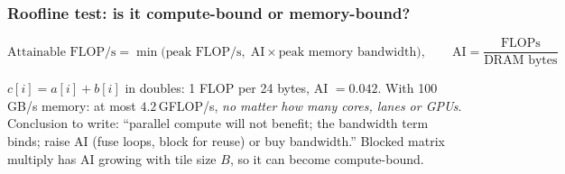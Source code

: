 \subsubsection*{Roofline test: is it compute-bound or memory-bound?\bs}\label{sec:roofline}
\[
\text{Attainable FLOP/s}=\min\big(\text{peak FLOP/s},\; \text{AI}\times\text{peak memory bandwidth}\big),\qquad
\text{AI}=\frac{\text{FLOPs}}{\text{DRAM bytes}}
\]
\begin{ex}
$c[i]=a[i]+b[i]$ in doubles: 1 FLOP per 24 bytes, AI $=0.042$. With 100\,GB/s memory: at most $4.2$\,GFLOP/s, \emph{no matter how many cores, lanes or GPUs}. Conclusion to write: ``parallel compute will not benefit; the bandwidth term binds; raise AI (fuse loops, block for reuse) or buy bandwidth.'' Blocked matrix multiply has AI growing with tile size $B$, so it can become compute-bound.
\end{ex}

